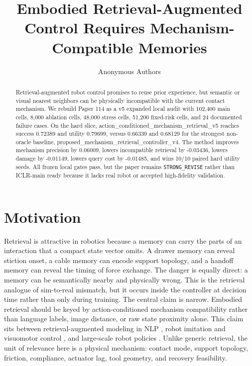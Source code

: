 \documentclass{article}
\title{Embodied Retrieval-Augmented Control Requires Mechanism-Compatible Memories}
\author{Anonymous Authors}
\begin{document}
\maketitle
\begin{abstract}
Retrieval-augmented robot control promises to reuse prior experience, but semantic or visual nearest neighbors can be physically incompatible with the current contact mechanism. We rebuild Paper 114 as a v5 expanded local audit with 102,400 main cells, 8,000 ablation cells, 48,000 stress cells, 51,200 fixed-risk cells, and 24 documented failure cases. On the hard slice, action\_conditioned\_mechanism\_retrieval\_v5 reaches success 0.72389 and utility 0.79699, versus 0.66339 and 0.68129 for the strongest non-oracle baseline, proposed\_mechanism\_retrieval\_controller\_v4. The method improves mechanism precision by 0.06009, lowers incompatible retrieval by -0.03436, lowers damage by -0.01149, lowers query cost by -0.01485, and wins 10/10 paired hard utility seeds. All frozen local gates pass, but the paper remains \texttt{STRONG\_REVISE} rather than ICLR-main ready because it lacks real robot or accepted high-fidelity validation.
\end{abstract}
\section{Motivation}
Retrieval is attractive in robotics because a memory can carry the parts of an interaction that a compact state vector omits. A drawer memory can reveal stiction onset, a cable memory can encode support topology, and a handoff memory can reveal the timing of force exchange. The danger is equally direct: a memory can be semantically nearby and physically wrong. This is the retrieval analogue of sim-to-real mismatch, but it occurs inside the controller at decision time rather than only during training.
The central claim is narrow. Embodied retrieval should be keyed by action-conditioned mechanism compatibility rather than language labels, image distance, or raw state proximity alone. This claim sits between retrieval-augmented modeling in NLP \citep{lewis2020rag,khandelwal2020knn}, robot imitation and visuomotor control \citep{ross2011dagger,levine2016visuomotor,kalashnikov2018qtopt}, and large-scale robot policies \citep{brohan2022rt1,ahn2022saycan}. Unlike generic retrieval, the unit of relevance here is a physical mechanism: contact mode, support topology, friction, compliance, actuator lag, tool geometry, and recovery feasibility.
\end{document}

